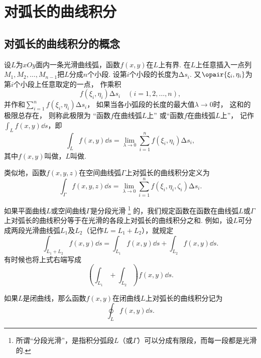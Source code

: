 \section{对弧长的曲线积分}
\subsection{对弧长的曲线积分的概念}
\begin{definition}
设\(L\)为\(xOy\)面内一条光滑曲线弧，函数\(f(x,y)\)在\(L\)上有界.
在\(L\)上任意插入一点列\(M_1,M_2,\dotsc,M_{n-1}\)把\(L\)分成\(n\)个小段.
设第\(i\)个小段的长度为\(\increment s_i\).
又\(\opair{\xi_i,\eta_i}\)为第\(i\)个小段上任意取定的一点，
作乘积\begin{equation*}
	f(\xi_i,\eta_i) \increment s_i \quad(i=1,2,\dotsc,n),
\end{equation*}
并作和\(\sum_{i=1}^n f(\xi_i,\eta_i) \increment s_i\)，
如果当各小弧段的长度的最大值\(\lambda\to0\)时，
这和的极限总存在，
则称此极限为
“函数\(f\)在曲线弧\(L\)上”
或“函数\(f\)在曲线弧\(L\)上”，
记作\(\int_L f(x,y) \dd{s}\)，即\begin{equation*}
\int_L f(x,y) \dd{s}
= \lim_{\lambda\to0} \sum_{i=1}^n f(\xi_i,\eta_i) \increment s_i,
\end{equation*}其中\(f(x,y)\)叫做，\(L\)叫做.

类似地，函数\(f(x,y,z)\)在空间曲线弧\(\Gamma\)上对弧长的曲线积分定义为\begin{equation*}
\int_\Gamma f(x,y,z) \dd{s}
=\lim_{\lambda\to0} \sum_{i=1}^n f(\xi_i,\eta_i,\zeta_i) \increment s_i.
\end{equation*}

如果平面曲线\(L\)或空间曲线\(\Gamma\)是分段光滑%
\footnote{所谓“分段光滑”，是指积分弧段\(L\)（或\(\Gamma\)）可以分成有限段，而每一段都是光滑的.}%
的，我们规定函数在函数在曲线弧\(L\)或\(\Gamma\)上对弧长的曲线积分等于在光滑的各段上对弧长的曲线积分之和.
例如，设\(L\)可分成两段光滑曲线弧\(L_1\)及\(L_2\)（记作\(L=L_1+L_2\)），就规定
\begin{equation*}
	\int_{L_1+L_2} f(x,y) \dd{s}
	= \int_{L_1} f(x,y) \dd{s}
	+ \int_{L_2} f(x,y) \dd{s}.
\end{equation*}
有时候也将上式右端写成\begin{equation*}
	\left( \int_{L_1} + \int_{L_2} \right) f(x,y) \dd{s}.
\end{equation*}

如果\(L\)是闭曲线，那么函数\(f(x,y)\)在闭曲线\(L\)上对弧长的曲线积分记为\begin{equation*}
	\oint_L f(x,y) \dd{s}.
\end{equation*}
\end{definition}

